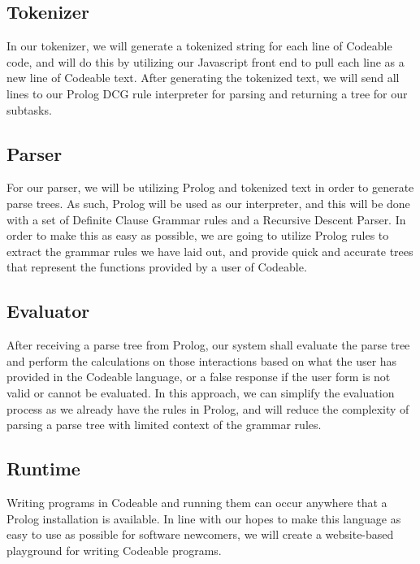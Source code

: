 \documentclass{article}
\begin{document}
    \subsection{Tokenizer}

    In our tokenizer, we will generate a tokenized string for each line
    of Codeable code, and will do this by utilizing our Javascript
    front end to pull each line as a new line of Codeable text. After
    generating the tokenized text, we will send all lines to our Prolog
    DCG rule interpreter for parsing and returning a tree for our
    subtasks.

    \subsection{Parser}

    For our parser, we will be utilizing Prolog and tokenized text in
    order to generate parse trees. As such, Prolog will be used as our
    interpreter, and this will be done with a set of Definite Clause
    Grammar rules and a Recursive Descent Parser. In order to make this
    as easy as possible, we are going to utilize Prolog rules to
    extract the grammar rules we have laid out, and provide quick and
    accurate trees that represent the functions provided by a user of
    Codeable.

    \subsection{Evaluator}

    After receiving a parse tree from Prolog, our system shall evaluate
    the parse tree and perform the calculations on those interactions
    based on what the user has provided in the Codeable language, or a
    false response if the user form is not valid or cannot be
    evaluated. In this approach, we can simplify the evaluation process
    as we already have the rules in Prolog, and will reduce the
    complexity of parsing a parse tree with limited context of the
    grammar rules.

    \subsection{Runtime}

    Writing programs in Codeable and running them can occur anywhere
    that a Prolog installation is available. In line with our hopes to
    make this language as easy to use as possible for software
    newcomers, we will create a website-based playground for writing
    Codeable programs.
    
\end{document}
